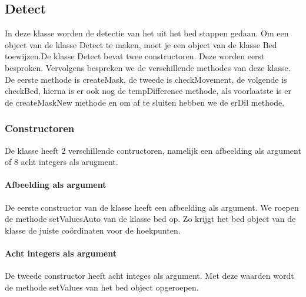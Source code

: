 \subsection{Detect}
\label{mRefDet}
In deze klasse worden de detectie van het uit het bed stappen gedaan. Om een object van de klasse Detect te maken, moet je een object van de klasse Bed toewijzen.De klasse Detect bevat twee constructoren. Deze worden eerst besproken. Vervolgens bespreken we de verschillende methodes van deze klasse. De eerste methode is createMask, de tweede is checkMovement, de volgende is checkBed, hierna is er ook nog de tempDifference methode, als voorlaatste is er de createMaskNew methode en om af te sluiten hebben we de erDil methode. 

\subsubsection{Constructoren}
De klasse heeft 2 verschillende contructoren, namelijk een afbeelding als argument of 8 acht integers als arugment.

\paragraph{Afbeelding als argument}
De eerste constructor van de klasse heeft een afbeelding als argument. We  roepen de methode setValuesAuto van de klasse bed op. Zo krijgt het bed object van de klasse de juiste co\"ordinaten voor de hoekpunten. 

\paragraph{Acht integers als argument}
De tweede constructor heeft acht integes als argument. Met deze waarden wordt de methode setValues van het bed object opgeroepen.

